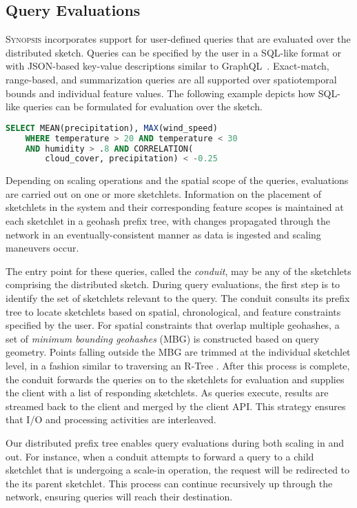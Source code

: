 \subsection{Query Evaluations}
\label{subsec:query-eval}
\textsc{Synopsis} incorporates support for user-defined queries that are evaluated over the distributed sketch.  Queries can be specified by the user in a SQL-like format or with JSON-based key-value descriptions similar to GraphQL~\cite{graphql}. Exact-match, range-based, and summarization queries are all supported over spatiotemporal bounds and individual feature values. The following example depicts how SQL-like queries can be formulated for evaluation over the sketch.

\begin{lstlisting}[language=SQL,style=custompy]
    SELECT MEAN(precipitation), MAX(wind_speed)
    WHERE temperature > 20 AND temperature < 30
    AND humidity > .8 AND CORRELATION(
        cloud_cover, precipitation) < -0.25
\end{lstlisting}

Depending on scaling operations and the spatial scope of the queries, evaluations are carried out on one or more sketchlets. Information on the placement of sketchlets in the system and their corresponding feature scopes is maintained at each sketchlet in a geohash prefix tree, with changes propagated through the network in an eventually-consistent manner as data is ingested and scaling maneuvers occur.

The entry point for these queries, called the \emph{conduit}, may be any of the sketchlets comprising the distributed sketch. During query evaluations, the first step is to identify the set of sketchlets relevant to the query. The conduit consults its prefix tree to locate sketchlets based on spatial, chronological, and feature constraints specified by the user. For spatial constraints that overlap multiple geohashes, a set of \emph{minimum bounding geohashes} (MBG) is constructed based on query geometry. Points falling outside the MBG are trimmed at the individual sketchlet level, in a fashion similar to traversing an R-Tree \cite{guttman1984r}.  After this process is complete, the conduit forwards the queries on to the sketchlets for evaluation and supplies the client with a list of responding sketchlets. As queries execute, results are streamed back to the client and merged by the client API. This strategy ensures that I/O and processing activities are interleaved.

Our distributed prefix tree enables query evaluations during both scaling in and out. For instance, when a conduit attempts to forward a query to a child sketchlet that is undergoing a scale-in operation, the request will be redirected to the its parent sketchlet. This process can continue recursively up through the network, ensuring queries will reach their destination.

